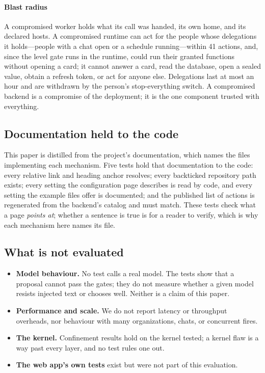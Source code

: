 \paragraph{Blast radius}
A compromised worker holds what its call was handed, its own home, and
its declared hosts. A compromised runtime can act for the people whose
delegations it holds---people with a chat open or a schedule
running---within 41 actions, and, since the level gate runs in the
runtime, could run their granted functions without opening a card; it
cannot answer a card, read the database, open a sealed value, obtain a
refresh token, or act for anyone else. Delegations last at most an hour
and are withdrawn by the person's stop-everything switch. A
compromised backend is a compromise of the deployment; it is the one
component trusted with everything.

\subsection{Documentation held to the code}
\label{sec:eval-docs}

This paper is distilled from the project's documentation, which names
the files implementing each mechanism. Five tests hold that
documentation to the code: every relative link and heading anchor
resolves; every backticked repository path exists; every setting the
configuration page describes is read by code, and every setting the
example files offer is documented; and the published list of actions is
regenerated from the backend's catalog and must match. These tests
check what a page \emph{points at}; whether a sentence is true is for a
reader to verify, which is why each mechanism here names its file.

\subsection{What is not evaluated}
\label{sec:eval-not}

\begin{itemize}
\item \textbf{Model behaviour.} No test calls a real model. The tests
  show that a proposal cannot pass the gates; they do not measure
  whether a given model resists injected text or chooses well. Neither
  is a claim of this paper.
\item \textbf{Performance and scale.} We do not report latency or
  throughput overheads, nor behaviour with many organizations, chats,
  or concurrent fires.
\item \textbf{The kernel.} Confinement results hold on the kernel
  tested; a kernel flaw is a way past every layer, and no test rules one
  out.
\item \textbf{The web app's own tests} exist but were not part of this
  evaluation.
\end{itemize}
